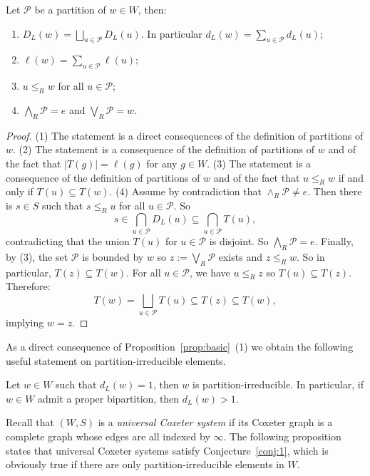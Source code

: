 \documentclass[Unicode]{cedram-alco}
\theoremstyle{definition}
\begin{document}
\begin{prop}\label{prop:basic} Let $\mathcal P$ be a partition of $w\in W$, then:
\begin{enumerate}
\item $D_L(w)=\bigsqcup_{u\in \mathcal P} D_L(u)$. In particular $d_L(w)=\sum_{u\in\mathcal P} d_L(u)$;
\item $\ell(w)=\sum_{u\in \mathcal P} \ell(u)$;
\item $u\leq_R w$ for all $u\in\mathcal P$;
\item $\bigwedge_R \mathcal P = e$ and $\bigvee_R\mathcal P=w$.
\end{enumerate}
\end{prop}
\begin{proof}  (1) The statement is a direct consequences of the definition of partitions of $w$.  (2) The statement is a consequence of the definition of partitions of $w$ and of the fact that $|T(g)|=\ell(g)$ for any $g\in W$. (3) The statement is a consequence of the definition of partitions of $w$ and of the fact that $u\leq_R w$ if and only if $T(u)\subseteq T(w)$. (4) Assume by contradiction that $\wedge_R \mathcal P \not = e$. Then there is $s \in S$ such that $s\leq_R u$ for all $u\in\mathcal P$. So 
$$
s\in \bigcap_{u\in\mathcal P}D_L(u)\subseteq \bigcap_{u\in\mathcal P} T(u),
$$
contradicting that the union $T(u)$ for $u\in\mathcal P$ is disjoint. So $\bigwedge_R \mathcal P = e$. Finally, by (3), the set $\mathcal P$ is bounded by $w$ so $z:=\bigvee_R \mathcal P$ exists and $z\leq_R w$. So in particular, $T(z)\subseteq T(w)$. For all $u\in\mathcal P$, we have $u\leq_R z$ so $T(u)\subseteq T(z)$. Therefore: 
$$
T(w)= \bigsqcup_{u\in\mathcal P} T(u)\subseteq T(z)\subseteq T(w),
$$
implying $w=z$.
\end{proof}

As a direct consequence of Proposition~\ref{prop:basic}~(1) we obtain the following useful statement on partition-irreducible elements.

\begin{coro}\label{cor:Bi} Let $w\in W$ such that $d_L(w)=1$, then $w$ is partition-irreducible. In particular, if $w\in W$ admit a proper bipartition, then $d_L(w)>1$.
\end{coro}

Recall that $(W,S)$ is a {\em universal Coxeter system} if its Coxeter graph is a complete graph whose edges are all indexed by $\infty$. The following proposition states that universal Coxeter systems satisfy Conjecture~\ref{conj:1}, which is obviously true if there are only partition-irreducible elements in $W$.
\end{document}
